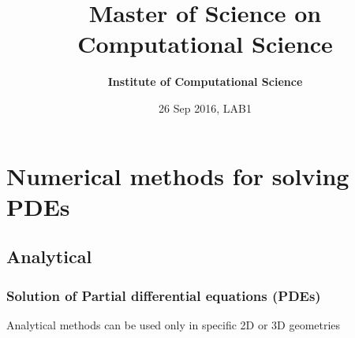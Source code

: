\documentclass[handout]{beamer}
{
\usepackage{fullpage}
\usepackage{hyperref}
\usepackage{amssymb} 
}
\title[PDE LAB1, 2016]{Master of Science on Computational Science}
\author[Dr. Drosos Kourounis] %
{\textbf{Institute of Computational Science}}
\institute[ICS] %
{
Dr. Drosos Kourounis \& TA: Hardik Kothari
}
\date[26 Sep, 2016]{26 Sep 2016, LAB1}
\begin{document}
\begin{frame}
  \titlepage
\end{frame}

\section{Numerical methods for solving PDEs}

\subsection{Analytical}

\begin{frame}
\frametitle{Solution of Partial differential equations (PDEs)}

\begin{block}{}
\scriptsize{Analytical methods can be used only in specific 2D or 3D geometries}
\end{block}

\vfill


\end{frame}
\end{document}
